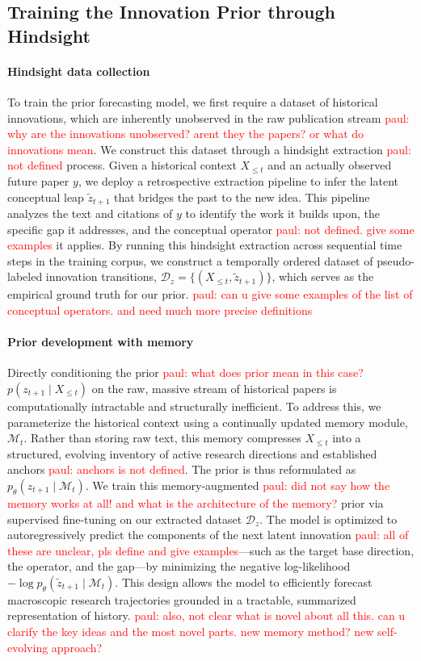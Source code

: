 \documentclass{article} %
\newcommand{\paul}[1]{\textcolor{red}{paul: #1}}
\begin{document}
\subsection{Training the Innovation Prior through Hindsight}

\paragraph{Hindsight data collection} To train the prior forecasting model, we first require a dataset of historical innovations, which are inherently unobserved in the raw publication stream \paul{why are the innovations unobserved? arent they the papers? or what do innovations mean}. We construct this dataset through a hindsight extraction \paul{not defined} process. Given a historical context $X_{\le t}$ and an actually observed future paper $y$, we deploy a retrospective extraction pipeline to infer the latent conceptual leap $\tilde{z}_{t+1}$ that bridges the past to the new idea. This pipeline analyzes the text and citations of $y$ to identify the work it builds upon, the specific gap it addresses, and the conceptual operator \paul{not defined. give some examples} it applies. By running this hindsight extraction across sequential time steps in the training corpus, we construct a temporally ordered dataset of pseudo-labeled innovation transitions, $\mathcal{D}_z = \{(X_{\le t}, \tilde{z}_{t+1})\}$, which serves as the empirical ground truth for our prior. \paul{can u give some examples of the list of conceptual operators. and need much more precise definitions}

\paragraph{Prior development with memory} Directly conditioning the prior \paul{what does prior mean in this case?} $p(z_{t+1} \mid X_{\le t})$ on the raw, massive stream of historical papers is computationally intractable and structurally inefficient. To address this, we parameterize the historical context using a continually updated memory module, $\mathcal{M}_t$. Rather than storing raw text, this memory compresses $X_{\le t}$ into a structured, evolving inventory of active research directions and established anchors \paul{anchors is not defined}. The prior is thus reformulated as $p_\theta(z_{t+1} \mid \mathcal{M}_t)$. We train this memory-augmented \paul{did not say how the memory works at all! and what is the architecture of the memory?} prior via supervised fine-tuning on our extracted dataset $\mathcal{D}_z$. The model is optimized to autoregressively predict the components of the next latent innovation \paul{all of these are unclear, pls define and give examples}—such as the target base direction, the operator, and the gap—by minimizing the negative log-likelihood $-\log p_\theta(\tilde{z}_{t+1} \mid \mathcal{M}_t)$. This design allows the model to efficiently forecast macroscopic research trajectories grounded in a tractable, summarized representation of history. \paul{also, not clear what is novel about all this. can u clarify the key ideas and the most novel parts. new memory method? new self-evolving approach?}
\end{document}
